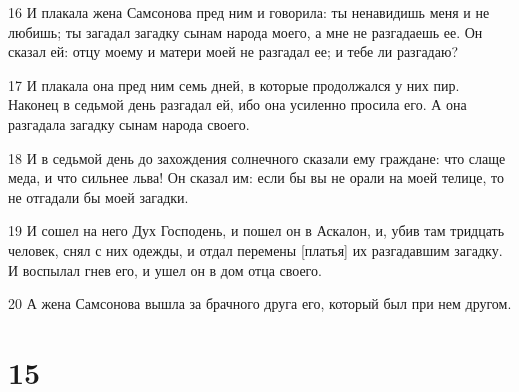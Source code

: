 \par 16 И плакала жена Самсонова пред ним и говорила: ты ненавидишь меня и не любишь; ты загадал загадку сынам народа моего, а мне не разгадаешь ее. Он сказал ей: отцу моему и матери моей не разгадал ее; и тебе ли разгадаю?
\par 17 И плакала она пред ним семь дней, в которые продолжался у них пир. Наконец в седьмой день разгадал ей, ибо она усиленно просила его. А она разгадала загадку сынам народа своего.
\par 18 И в седьмой день до захождения солнечного сказали ему граждане: что слаще меда, и что сильнее льва! Он сказал им: если бы вы не орали на моей телице, то не отгадали бы моей загадки.
\par 19 И сошел на него Дух Господень, и пошел он в Аскалон, и, убив там тридцать человек, снял с них одежды, и отдал перемены [платья] их разгадавшим загадку. И воспылал гнев его, и ушел он в дом отца своего.
\par 20 А жена Самсонова вышла за брачного друга его, который был при нем другом.

\chapter{15}

